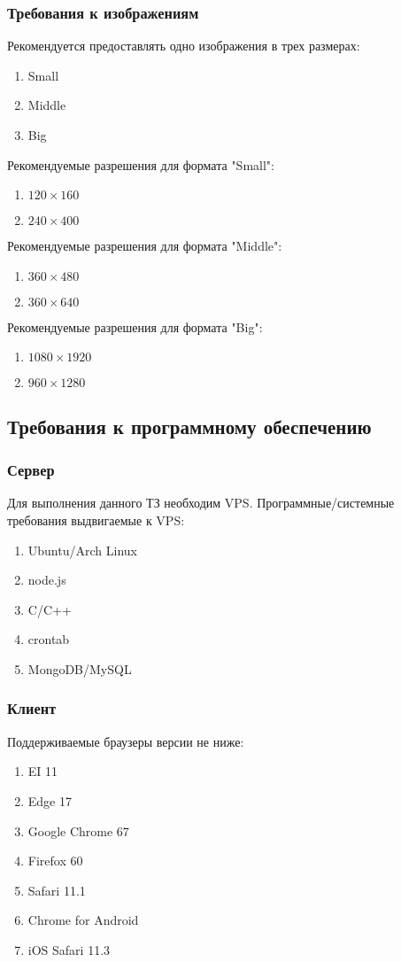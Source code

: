 \subsubsection{Требования к изображениям}
Рекомендуется предоставлять одно изображения в трех размерах:
\begin{enumerate}
    \item Small
    \item Middle
    \item Big
\end{enumerate}
Рекомендуемые разрешения для формата "Small":
\begin{enumerate}
    \item $120 \times 160$
    \item $240 \times 400$
\end{enumerate}
Рекомендуемые разрешения для формата "Middle":
\begin{enumerate}
    \item $ 360 \times 480 $
    \item $ 360 \times 640 $
\end{enumerate}
Рекомендуемые разрешения для формата "Big":
\begin{enumerate}
    \item $ 1080 \times 1920 $
    \item $ 960 \times 1280 $
\end{enumerate}

\subsection{Требования к программному обеспечению}
\subsubsection{Сервер}
Для выполнения данного ТЗ необходим VPS. Программные/системные требования выдвигаемые к VPS:
\begin{enumerate}
    \item Ubuntu/Arch Linux
    \item node.js
    \item C/C++
    \item crontab
    \item MongoDB/MySQL
\end{enumerate}
\subsubsection{Клиент}
Поддерживаемые браузеры версии не ниже:
\begin{enumerate}
    \item EI 11
    \item Edge 17
    \item Google Chrome 67
    \item Firefox 60
    \item Safari 11.1
    \item Chrome for Android
    \item iOS Safari 11.3
\end{enumerate}

